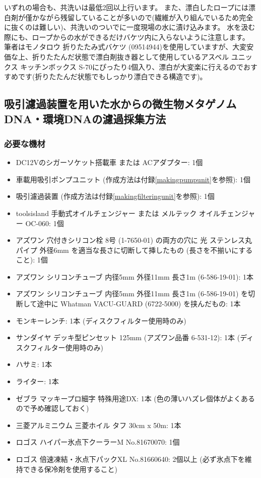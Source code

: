 \documentclass[titlepage,10pt,a4paper,uplatex]{jsbook}
\begin{document}
いずれの場合も、共洗いは最低2回以上行います。
また、漂白したロープには漂白剤が僅かながら残留していることが多いので(繊維が入り組んでいるため完全に抜くのは難しい)、共洗いのついでに一度現場の水に漬け込みます。
水を汲む際にも、ロープからの水ができるだけバケツ内に入らないように注意します。
筆者はモノタロウ 折りたたみ式バケツ (09514944)を使用していますが、大変安価な上、折りたたんだ状態で漂白剤抜き器として使用しているアスベル ユニックス キッチンボックス S-70にぴったり4個入り、漂白が大変楽に行えるのでおすすめです(折りたたんだ状態でもしっかり漂白できる構造です)。

\subsection{吸引濾過装置を用いた水からの微生物メタゲノムDNA・環境DNAの濾過採集方法}

\subsubsection{必要な機材}
\begin{itemize}
\item DC12Vのシガーソケット搭載車 または ACアダプター: 1個
\item 車載用吸引ポンプユニット (作成方法は付録\ref{makingpumpunit}を参照): 1個
\item 吸引濾過装置 (作成方法は付録\ref{makingfilteringunit}を参照): 1個
\item toolsisland 手動式オイルチェンジャー または メルテック オイルチェンジャー OC-060: 1個
\item アズワン 穴付きシリコン栓 8号 (1-7650-01) の両方の穴に 光 ステンレス丸パイプ 外径6mm を適当な長さに切断して挿したもの (長さを不揃いにすること): 1個
\item アズワン シリコンチューブ 内径5mm 外径11mm 長さ1m (6-586-19-01): 1本
\item アズワン シリコンチューブ 内径5mm 外径11mm 長さ1m (6-586-19-01) を切断して途中に Whatman VACU-GUARD (6722-5000) を挟んだもの: 1本
\item モンキーレンチ: 1本 (ディスクフィルター使用時のみ)
\item サンダイヤ デッキ型ピンセット 125mm (アズワン品番 6-531-12): 1本 (ディスクフィルター使用時のみ)
\item ハサミ: 1本
\item ライター: 1本
\item ゼブラ マッキープロ細字 特殊用途DX: 1本 (色の薄いハズレ個体がよくあるので予め確認しておく)
\item 三菱アルミニウム 三菱ホイル タフ 30cm x 50m: 1本
\item ロゴス ハイパー氷点下クーラーM No.81670070: 1個
\item ロゴス 倍速凍結・氷点下パックXL No.81660640: 2個以上 (必ず氷点下を維持できる保冷剤を使用すること)
\end{itemize}
\end{document}
